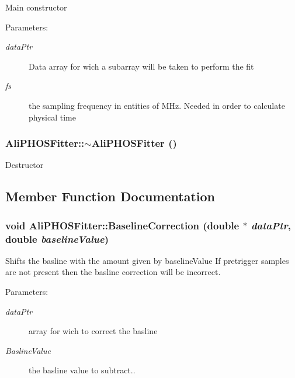 Main constructor \begin{Desc}
\item[Parameters:]
\begin{description}
\item[{\em data\-Ptr}]Data array for wich a subarray will be taken to perform the fit \item[{\em fs}]the sampling frequency in entities of MHz. Needed in order to calculate physical time \end{description}
\end{Desc}
\subsubsection{\setlength{\rightskip}{0pt plus 5cm}Ali\-PHOSFitter::$\sim${\bf Ali\-PHOSFitter} ()}\label{classAliPHOSFitter_a2}


Destructor 

\subsection{Member Function Documentation}
\subsubsection{\setlength{\rightskip}{0pt plus 5cm}void Ali\-PHOSFitter::Baseline\-Correction (double $\ast$ {\em data\-Ptr}, double {\em baseline\-Value})}\label{classAliPHOSFitter_a4}


Shifts the basline with the amount given by baseline\-Value If pretrigger samples are not present then the basline correction will be incorrect. \begin{Desc}
\item[Parameters:]
\begin{description}
\item[{\em data\-Ptr}]array for wich to correct the basline \item[{\em Basline\-Value}]the basline value to subtract.. \end{description}
\end{Desc}
